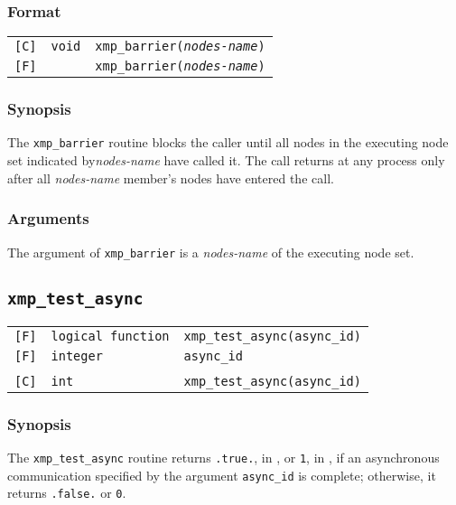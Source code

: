 \subsubsection*{Format}

\begin{tabular}{lll}

\verb![C]!&  {\tt void}& {\tt  xmp\_barrier({\it nodes-name})}\\

\verb![F]!&  & {\tt xmp\_barrier({\it nodes-name})}

\end{tabular}

\subsubsection*{Synopsis}
    The {\tt xmp\_barrier} routine blocks the caller until all nodes in the executing node set 
    indicated by{\it nodes-name} have called it.
    The call returns at any process only after all {\it nodes-name} member's nodes
    have entered the call.

\subsubsection*{Arguments}
    The argument of {\tt xmp\_barrier} is a {\it nodes-name} of the executing node set.

\vspace{0.3cm}

\subsection{\tt xmp\_test\_async}

\begin{tabular}{lll}

\verb![F]!& {\tt logical function} & {\tt xmp\_test\_async(async\_id)}\\
\verb![F]!& {\tt integer} & {\tt async\_id}\\
          & & \\
\verb![C]!&  {\tt int} & {\tt  xmp\_test\_async({\tt async\_id})}

\end{tabular}

\subsubsection*{Synopsis}

The {\tt xmp\_test\_async} routine returns {\tt .true.}, in {\Fort}, or
{\tt 1}, in {\C}, if an asynchronous communication specified by the
argument {\tt async\_id} is complete; otherwise, it returns {\tt .false.}
or {\tt 0}.


